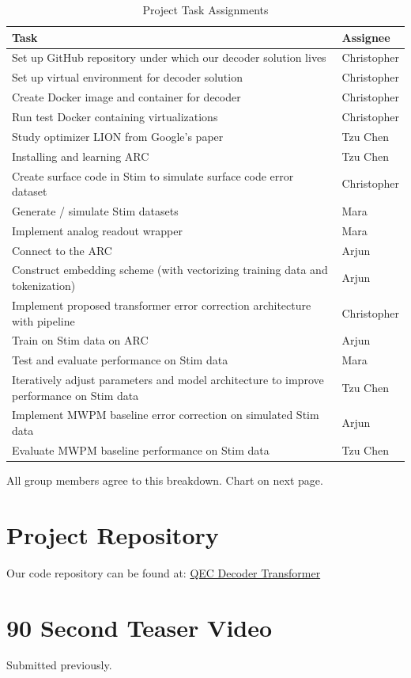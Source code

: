 \documentclass[12pt]{article}
\begin{document}
\begin{table}[htbp]
\centering
\renewcommand{\arraystretch}{1.5}
\begin{tabular}{>{\raggedright\arraybackslash}p{} >{\raggedright\arraybackslash}p{}}
\toprule
\rowcolor{lightgray}
\textbf{Task} & \textbf{Assignee} \\
\midrule
Set up GitHub repository under which our decoder solution lives & Christopher \\
\rowcolor{lightgray}
Set up virtual environment for decoder solution & Christopher \\
Create Docker image and container for decoder & Christopher \\
\rowcolor{lightgray}
Run test Docker containing virtualizations & Christopher \\
Study optimizer LION from Google's paper & Tzu Chen \\
\rowcolor{lightgray}
Installing and learning ARC & Tzu Chen \\
Create surface code in Stim to simulate surface code error dataset & Christopher \\
\rowcolor{lightgray}
Generate / simulate Stim datasets & Mara \\
Implement analog readout wrapper & Mara \\
\rowcolor{lightgray}
Connect to the ARC & Arjun \\
Construct embedding scheme (with vectorizing training data and tokenization) & Arjun \\
\rowcolor{lightgray}
Implement proposed transformer error correction architecture with pipeline & Christopher \\
Train on Stim data on ARC & Arjun \\
\rowcolor{lightgray}
Test and evaluate performance on Stim data & Mara \\
Iteratively adjust parameters and model architecture to improve performance on Stim data & Tzu Chen \\
\rowcolor{lightgray}
Implement MWPM baseline error correction on simulated Stim data & Arjun \\
Evaluate MWPM baseline performance on Stim data & Tzu Chen \\
\bottomrule
\end{tabular}
\caption{Project Task Assignments}
\label{tab:tasks}
\end{table}

All group members agree to this breakdown. Chart on next page.

\section{Project Repository}

Our code repository can be found at: \href{https://github.com/PrismaticFlame/qec_decoder_transformer}{QEC Decoder Transformer}

\section{90 Second Teaser Video}

Submitted previously.
\end{document}
